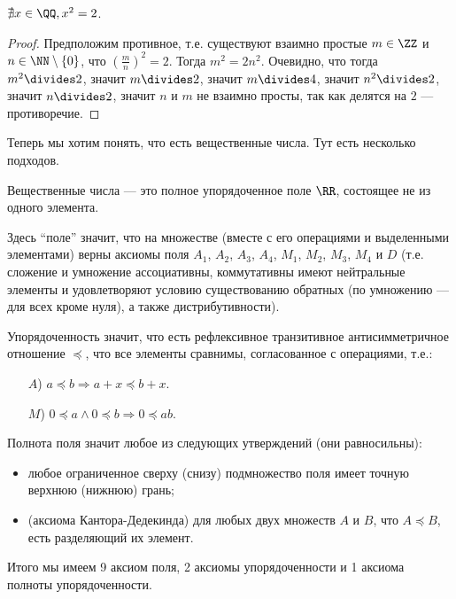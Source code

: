 \documentclass[12pt,a4paper]{article}
\begin{document}
    \begin{theorem}
        $\nexists x\in \QQ, x^2 = 2$.
    \end{theorem}

    \begin{proof}
        Предположим противное, т.е. существуют взаимно простые $m \in \ZZ$ и $n \in \NN\setminus\{0\}$, что $(\frac{m}{n})^2 = 2$. Тогда $m^2 = 2n^2$. Очевидно, что тогда $m^2 \divides 2$, значит $m\divides 2$, значит $m\divides 4$, значит $n^2 \divides 2$, значит $n \divides 2$, значит $n$ и $m$ не взаимно просты, так как делятся на $2$ --- противоречие.
    \end{proof}

    Теперь мы хотим понять, что есть вещественные числа. Тут есть несколько подходов.

    \begin{definition}
        Вещественные числа --- это полное упорядоченное поле $\RR$, состоящее не из одного элемента.
        
        Здесь ``поле'' значит, что на множестве (вместе с его операциями и выделенными элементами) верны аксиомы поля $A_1$, $A_2$, $A_3$, $A_4$, $M_1$, $M_2$, $M_3$, $M_4$ и $D$ (т.е. сложение и умножение ассоциативны, коммутативны имеют нейтральные элементы и удовлетворяют условию существованию обратных (по умножению --- для всех кроме нуля), а также дистрибутивности).
        
        Упорядоченность значит, что есть рефлексивное транзитивное антисимметричное отношение $\preccurlyeq$, что все элементы сравнимы, согласованное с операциями, т.е.:
        \begin{itemize}
            \item[$A$)] $a \preccurlyeq b \Rightarrow a + x \preccurlyeq b + x$.
            \item[$M$)] $0 \preccurlyeq a \wedge 0 \preccurlyeq b \Rightarrow 0 \preccurlyeq ab$.
        \end{itemize}

        Полнота поля значит любое из следующих утверждений (они равносильны):
        \begin{itemize}
            \item любое ограниченное сверху (снизу) подмножество поля имеет точную верхнюю (нижнюю) грань;
            \item (аксиома Кантора-Дедекинда) для любых двух множеств $A$ и $B$, что $A \preccurlyeq B$, есть разделяющий их элемент.
        \end{itemize}

        Итого мы имеем 9 аксиом поля, 2 аксиомы упорядоченности и 1 аксиома полноты упорядоченности.
    \end{definition}
\end{document}
